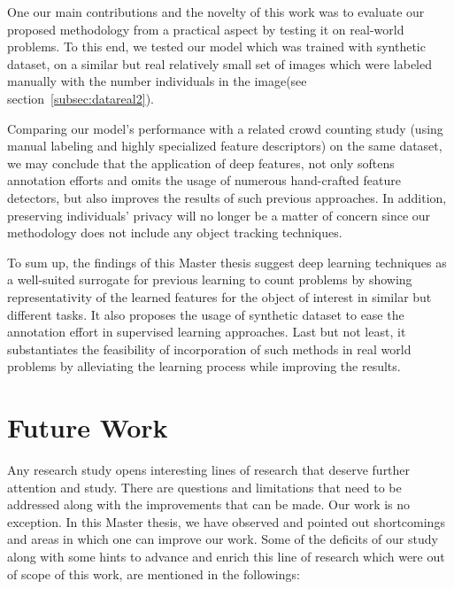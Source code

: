 \indent One our main contributions and the novelty of this work was to evaluate our proposed methodology from a practical aspect by testing it on real-world problems. To this end, we tested our model which was trained with synthetic dataset, on a similar but real relatively small set of images which were labeled manually with the number individuals in the image(see section~\ref{subsec:datareal2}).    

Comparing our model's performance with a related crowd counting study (using manual labeling and highly specialized feature descriptors) on the same dataset, we may conclude that the application of deep features, not only softens annotation efforts and omits the usage of numerous hand-crafted feature detectors, but also improves the results of such previous approaches. In addition, preserving individuals' privacy will no longer be a matter of concern since our methodology does not include any object tracking techniques.    

\noindent To sum up, the findings of this Master thesis suggest deep learning techniques as a well-suited surrogate for previous learning to count problems by showing representativity of the learned features for the object of interest in similar but different tasks. It also proposes the usage of synthetic dataset to ease the annotation effort in supervised learning approaches. Last but not least, it substantiates the feasibility of incorporation of such methods in real world problems by alleviating the learning process while improving the results.  

\section{Future Work}

Any research study opens interesting lines of research that deserve further attention and study. There are questions and limitations that need to be addressed along with the improvements that can be made. Our work is no exception. In this Master thesis, we have observed and pointed out shortcomings and areas in which one can improve our work. Some of the deficits of our study along with some hints to advance and enrich this line of research which were out of scope of this work, are mentioned in the followings:

